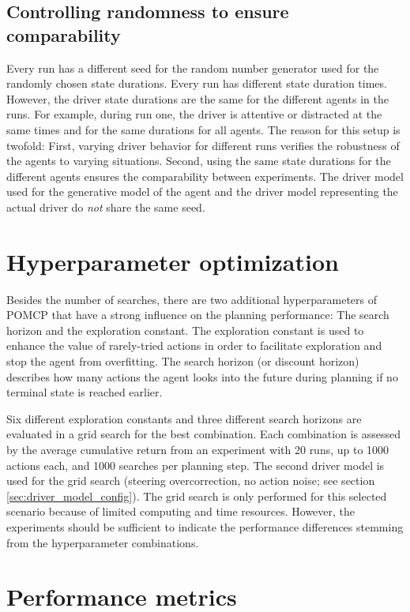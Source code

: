 \subsection{Controlling randomness to ensure comparability}

Every run has a different seed for the random number generator used for the randomly chosen state durations. Every run has different state duration times. However, the driver state durations are the same for the different agents in the runs. For example, during run one, the driver is attentive or distracted at the same times and for the same durations for all agents. The reason for this setup is twofold: First, varying driver behavior for different runs verifies the robustness of the agents to varying situations. Second, using the same state durations for the different agents ensures the comparability between experiments. The driver model used for the generative model of the agent and the driver model representing the actual driver do \emph{not} share the same seed.

\section{Hyperparameter optimization}
\label{sec:exp_hyperparams}

Besides the number of searches, there are two additional hyperparameters of POMCP that have a strong influence on the planning performance: The search horizon and the exploration constant. The exploration constant is used to enhance the value of rarely-tried actions in order to facilitate exploration and stop the agent from overfitting. The search horizon (or discount horizon) describes how many actions the agent looks into the future during planning if no terminal state is reached earlier.

Six different exploration constants and three different search horizons are evaluated in a grid search for the best combination. Each combination is assessed by the average cumulative return from an experiment with 20 runs, up to 1000 actions each, and 1000 searches per planning step. The second driver model is used for the grid search (steering overcorrection, no action noise; see section \ref{sec:driver_model_config}). The grid search is only performed for this selected scenario because of limited computing and time resources. However, the experiments should be sufficient to indicate the performance differences stemming from the hyperparameter combinations.

\section{Performance metrics}
\label{sec:perf_metrics}

